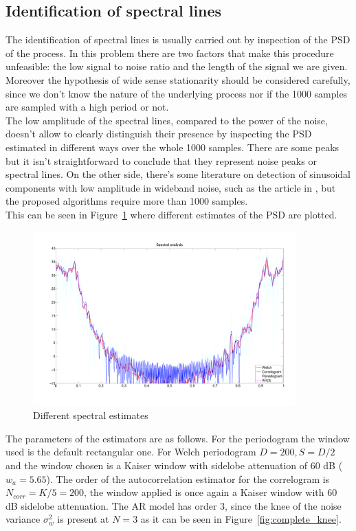 \documentclass[10pt]{article}
\numberwithin{equation}{section}
\begin{document}
\subsection{Identification of spectral lines}
The identification of spectral lines is usually carried out by inspection of the PSD of the process. In this problem there are two factors that make this procedure unfeasible: the low signal to noise ratio and the length of the signal we are given. Moreover the hypothesis of wide sense stationarity should be considered carefully, since we don't know the nature of the underlying process nor if the 1000 samples are sampled with a high period or not. \\
The low amplitude of the spectral lines, compared to the power of the noise, doesn't allow to clearly distinguish their presence by inspecting the PSD estimated in different ways over the whole 1000 samples. There are some peaks but it isn't straightforward to conclude that they represent noise peaks or spectral lines. On the other side, there's some literature on detection of sinusoidal components with low amplitude in wideband noise, such as the article in \cite{lowamp}, but the proposed algorithms require more than 1000 samples.\\
This can be seen in Figure~\ref{fig:complete_psd} where different estimates of the PSD are plotted.

\begin{figure}[h!]
  \centering
  \includegraphics[width=0.9\textwidth]{images/psd.pdf}
  \caption{Different spectral estimates}
  \label{fig:complete_psd}
\end{figure}

The parameters of the estimators are as follows. For the periodogram the window used is the default rectangular one. For Welch periodogram $D = 200, S = D/2$ and the window chosen is a Kaiser window with sidelobe attenuation of 60 dB ($w_a = 5.65$). The order of the autocorrelation estimator for the correlogram is $N_{corr} = K/5 = 200$, the window applied is once again a Kaiser window with 60 dB sidelobe attenuation. The AR model has order 3, since the knee of the noise variance $\sigma_w^2$ is present at $N=3$ as it can be seen in Figure~\ref{fig:complete_knee}.
\end{document}

